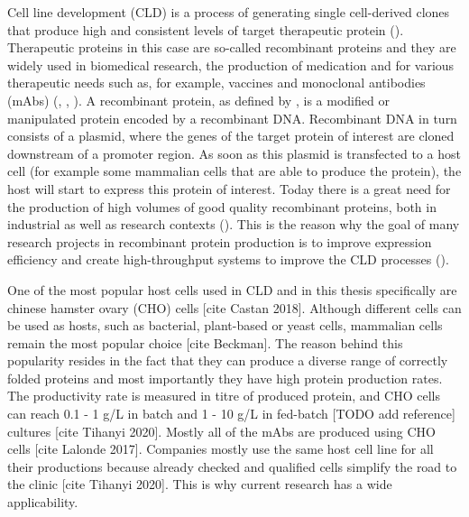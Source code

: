 Cell line development (CLD) is a process of generating single cell-derived clones that produce high and consistent levels of target therapeutic protein (\cite{lonza}). Therapeutic proteins in this case are so-called recombinant proteins and they are widely used in biomedical research, the production of medication and for various therapeutic needs such as, for example, vaccines and monoclonal antibodies (mAbs) (\cite{Ohtake_2013}, \cite{Jefferis_2017}, \cite{Funaro_1996}). A recombinant protein, as defined by \cite{Barbeau_2018}, is a modified or manipulated protein encoded by a recombinant DNA. Recombinant DNA in turn consists of a plasmid, where the genes of the target protein of interest are cloned downstream of a promoter region. As soon as this plasmid is transfected to a host cell (for example some mammalian cells that are able to produce the protein), the host will start to express this protein of interest. Today there is a great need for the production of high volumes of good quality recombinant proteins, both in industrial as well as research contexts (\cite{Tihanyi_2020}). This is the reason why the goal of many research projects in recombinant protein production is to improve expression efficiency and create high-throughput systems to improve the CLD processes (\cite{Tihanyi_2020}).


One of the most popular host cells used in CLD and in this thesis specifically are chinese hamster ovary (CHO) cells [cite Castan 2018]. Although different cells can be used as hosts, such as bacterial, plant-based or yeast cells, mammalian cells remain the most popular choice [cite Beckman]. The reason behind this popularity resides in the fact that they can produce a diverse range of correctly folded proteins and most importantly they have high protein production rates. The productivity rate is measured in titre of produced protein, and CHO cells can reach 0.1 - 1 g/L in batch and 1 - 10 g/L in fed-batch [TODO add reference] cultures [cite Tihanyi 2020]. Mostly all of the mAbs are produced using CHO cells [cite Lalonde 2017]. Companies mostly use the same host cell line for all their productions because already checked and qualified cells simplify the road to the clinic [cite Tihanyi 2020]. This is why current research has a wide applicability.

